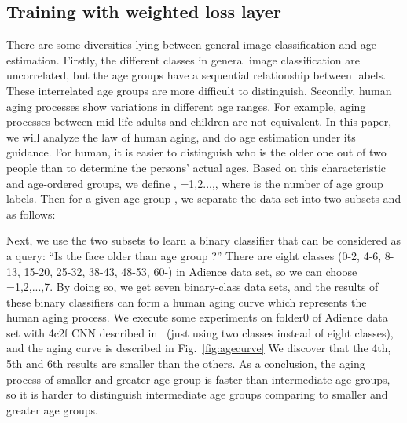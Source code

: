 \documentclass[journal]{IEEEtran}
\begin{document}
\subsection{Training with weighted loss layer}


There are some diversities lying between general image classification and age estimation. Firstly, the different classes in general image classification are uncorrelated,
 but the age groups have a sequential relationship between labels. These interrelated age groups are more difficult to distinguish. Secondly, human aging processes show variations in different age ranges. For example, aging processes between mid-life adults and children are not equivalent. In this paper, we will analyze the law of human aging, and do age estimation under its guidance. For human, it is easier to distinguish who is the older one out of two people than to determine the persons' actual ages. Based on this characteristic and age-ordered groups, we define , ={1,2...,}, where  is the number of age group labels. Then for a given age group , we separate the data set into two subsets  and  as follows:
\par

\par
Next, we use the two subsets to learn a binary classifier that can be considered as a query: ``Is the face older than age group ?'' There are eight classes (0-2, 4-6, 8-13, 15-20, 25-32, 38-43, 48-53, 60-) in Adience data set, so we can choose =1,2,...,7. By doing so, we get seven binary-class data sets, and the results of these binary classifiers can form a human aging curve which represents the human aging process. We execute some experiments on folder0 of Adience data set with 4c2f CNN described in~\cite{Agegenderbycnn} (just using two classes instead of eight classes), and the aging curve is described in Fig.~\ref{fig:agecurve} We discover that the 4th, 5th and 6th results are smaller than the others. As a conclusion, the aging process of smaller and greater age group is faster than intermediate age groups, so it is harder to distinguish intermediate age groups comparing to smaller and greater age groups.
\end{document}
